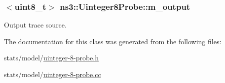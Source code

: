 \subsubsection[{\texorpdfstring{m\+\_\+output}{m_output}}]{$<$uint8\+\_\+t$>$ ns3\+::\+Uinteger8\+Probe\+::m\+\_\+output\hspace{0.3cm}{\ttfamily [private]}}\hypertarget{classns3_1_1Uinteger8Probe_a9e98d1957a6f12336a105bb017a2f6a1}{}\label{classns3_1_1Uinteger8Probe_a9e98d1957a6f12336a105bb017a2f6a1}


Output trace source. 



The documentation for this class was generated from the following files\+:\begin{DoxyCompactItemize}
\item 
stats/model/\hyperlink{uinteger-8-probe_8h}{uinteger-\/8-\/probe.\+h}\item 
stats/model/\hyperlink{uinteger-8-probe_8cc}{uinteger-\/8-\/probe.\+cc}\end{DoxyCompactItemize}
